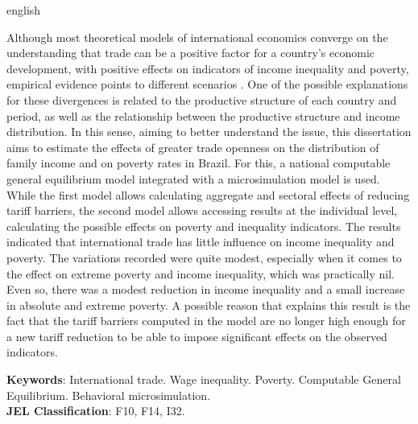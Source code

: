 

\begin{resumo}[Abstract]
	\begin{otherlanguage*}{english}
		\SingleSpacing
		
		Although most theoretical models of international economics converge on the understanding that trade can be a positive factor for a country's economic development, with positive effects on indicators of income inequality and poverty, empirical evidence points to different scenarios . One of the possible explanations for these divergences is related to the productive structure of each country and period, as well as the relationship between the productive structure and income distribution. In this sense, aiming to better understand the issue, this dissertation aims to estimate the effects of greater trade openness on the distribution of family income and on poverty rates in Brazil. For this, a national computable general equilibrium model integrated with a microsimulation model is used. While the first model allows calculating aggregate and sectoral effects of reducing tariff barriers, the second model allows accessing results at the individual level, calculating the possible effects on poverty and inequality indicators. The results indicated that international trade has little influence on income inequality and poverty. The variations recorded were quite modest, especially when it comes to the effect on extreme poverty and income inequality, which was practically nil. Even so, there was a modest reduction in income inequality and a small increase in absolute and extreme poverty. A possible reason that explains this result is the fact that the tariff barriers computed in the model are no longer high enough for a new tariff reduction to be able to impose significant effects on the observed indicators.
		
		\noindent 
		\textbf{Keywords}: International trade. Wage inequality. Poverty. Computable General Equilibrium. Behavioral microsimulation. \\
		\textbf{JEL Classification}: F10, F14, I32.
	\end{otherlanguage*}
\end{resumo}


